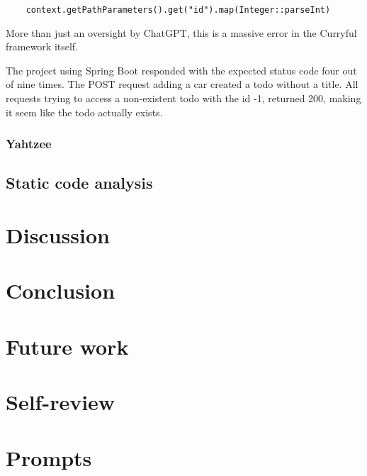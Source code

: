 \documentclass[a4paper]{article}
\begin{document}
\begin{verbatim}
	context.getPathParameters().get("id").map(Integer::parseInt)
\end{verbatim}

\noindent More than just an oversight by ChatGPT, this is a massive error in the
Curryful framework itself.
\newline

\noindent The project using Spring Boot responded with the expected status code
four out of nine times. The POST request adding a car created a todo without a
title. All requests trying to access a non-existent todo with the id -1,
returned 200, making it seem like the todo actually exists.

\subsubsection{Yahtzee}

\subsection{Static code analysis}

\section{Discussion}

\section{Conclusion}

\section{Future work}

\section{Self-review}

\newpage
\listoffigures

\newpage
\lstlistoflistings

\newpage
\listoftables

\newpage


\newpage
\appendix

\section{Prompts}
\end{document}
